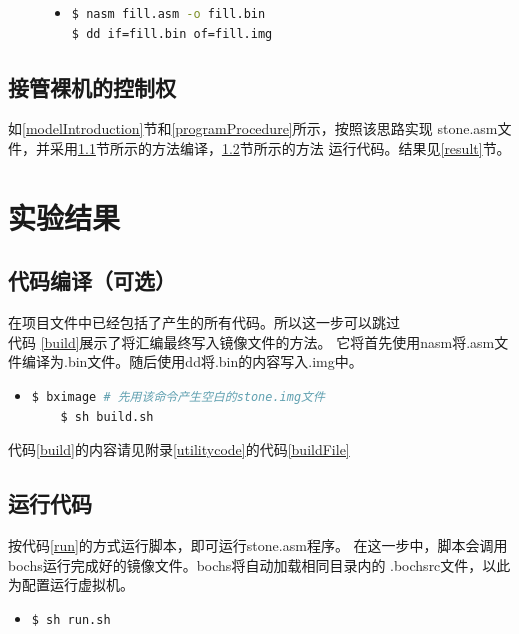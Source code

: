 \documentclass[a4paper]{article}
\newcommand{\codev}[1]{\textsf{#1}}
\begin{document}
\begin{figure}
\begin{itemize}
\item[] \begin{lstlisting}[language=sh, label=genPersonal, caption=编译fill.asm并将内容写入fill.img]
$ nasm fill.asm -o fill.bin 
$ dd if=fill.bin of=fill.img
\end{lstlisting}
\end{itemize}
\end{figure}

\subsection{接管裸机的控制权}
如\ref{modelIntroduction}节和\ref{programProcedure}所示，按照该思路实现
\codev{stone.asm}文件，并采用\ref{complile}节所示的方法编译，\ref{sec:run}节所示的方法
运行代码。结果见\ref{result}节。

\section{实验结果}
    \subsection{代码编译（可选）}\label{complile}
    在项目文件中已经包括了产生的所有代码。所以这一步可以跳过\\ 
    代码 \ref{build}展示了将汇编最终写入镜像文件的方法。
    它将首先使用nasm将.asm文件编译为.bin文件。随后使用dd将.bin的内容写入.img中。

    \begin{itemize}
    \item[] \begin{lstlisting}[language=sh, label=build, caption=将汇编转化为二进制并写入镜像]
    $ bximage # 先用该命令产生空白的stone.img文件
    $ sh build.sh
    \end{lstlisting}
    \end{itemize}
    代码\ref{build}的内容请见附录\ref{utilitycode}的代码\ref{buildFile}


    \subsection{运行代码}\label{sec:run}
    按代码\ref{run}的方式运行脚本，即可运行\codev{stone.asm}程序。
    在这一步中，脚本会调用bochs运行完成好的镜像文件。bochs将自动加载相同目录内的
    \codev{.bochsrc}文件，以此为配置运行虚拟机。
    \begin{itemize}
        \item[] \begin{lstlisting}[label=run, caption=运行方法]
$ sh run.sh
        \end{lstlisting}
    \end{itemize}
    
\end{document}
